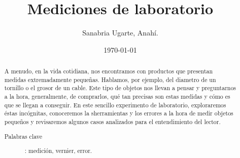 \documentclass[%
 reprint,
groupedaddress,
unsortedaddress,
 amsmath,amssymb,
 aps,
superscriptaddress
]{revtex4-2}
\begin{document}

\title{Mediciones de laboratorio}%

\author{Sanabria Ugarte, Anahí.}




\date{\today}%

\begin{abstract}
A menudo, en la vida cotidiana, nos encontramos con productos que presentan medidas extremadamente pequeñas. Hablamos, por ejemplo, del diametro de un tornillo o el grosor de un cable. Este tipo de objetos nos llevan a pensar y preguntarnos a la hora, generalmente, de comprarlos, qué tan precisas son estas medidas y cómo es que se llegan a conseguir. 
En este sencillo experimento de laboratorio, exploraremos éstas incógnitas, conoceremos la sherramientas y los errores a la hora de medir objetos pequeños y revisaremos algunos casos analizados para el entendimiento del lector.
\begin{description}
\item[Palabras clave]: medición, vernier, error.
\end{description}
\end{abstract}

\maketitle

\end{document}
